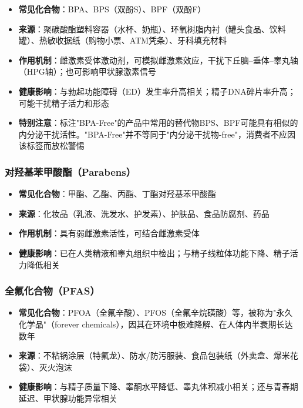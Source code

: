 \begin{itemize}[leftmargin=2cm]
	\item \textbf{常见化合物}：BPA、BPS（双酚S）、BPF（双酚F）
	\item \textbf{来源}：聚碳酸酯塑料容器（水杯、奶瓶）、环氧树脂内衬（罐头食品、饮料罐）、热敏收据纸（购物小票、ATM凭条）、牙科填充材料
	\item \textbf{作用机制}：雌激素受体激动剂，可模拟雌激素效应，干扰下丘脑--垂体--睾丸轴（HPG轴）；也可影响甲状腺激素信号
	\item \textbf{健康影响}：与勃起功能障碍（ED）发生率升高相关；精子DNA碎片率升高；可能干扰精子活力和形态
	\item \textbf{特别注意}：标注"BPA-Free"的产品中常用的替代物BPS、BPF可能具有相似的内分泌干扰活性。"BPA-Free"并不等同于"内分泌干扰物-free"，消费者不应因该标签而放松警惕
\end{itemize}

\subsubsection{对羟基苯甲酸酯（Parabens）}

\begin{itemize}[leftmargin=2cm]
	\item \textbf{常见化合物}：甲酯、乙酯、丙酯、丁酯对羟基苯甲酸酯
	\item \textbf{来源}：化妆品（乳液、洗发水、护发素）、护肤品、食品防腐剂、药品
	\item \textbf{作用机制}：具有弱雌激素活性，可结合雌激素受体
	\item \textbf{健康影响}：已在人类精液和睾丸组织中检出；与精子线粒体功能下降、精子活力降低相关
\end{itemize}

\subsubsection{全氟化合物（PFAS）}

\begin{itemize}[leftmargin=2cm]
	\item \textbf{常见化合物}：PFOA（全氟辛酸）、PFOS（全氟辛烷磺酸）等，被称为"永久化学品"（forever chemicals），因其在环境中极难降解、在人体内半衰期长达数年
	\item \textbf{来源}：不粘锅涂层（特氟龙）、防水/防污服装、食品包装纸（外卖盒、爆米花袋）、灭火泡沫
	\item \textbf{健康影响}：与精子质量下降、睾酮水平降低、睾丸体积减小相关；还与青春期延迟、甲状腺功能异常相关
\end{itemize}

